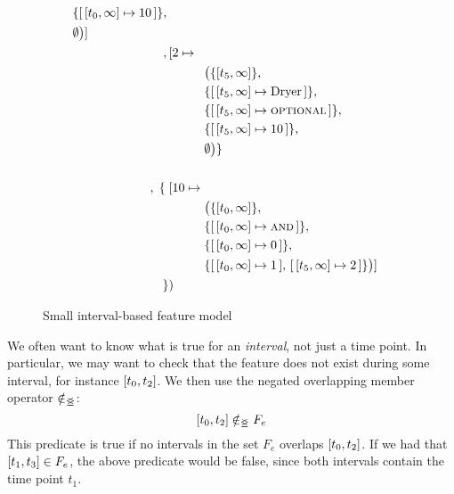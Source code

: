 \begin{figure}[htpb]
\begin{align*}
\begin{aligned}
             & \{\intervalmapping{t_0}{\forever}{10}\} ,\, \\ 
             & \emptyset\big)] \\
                \end{aligned} \\
         ,\, & [ 2 \mapsto \\
             & \hspace{1cm} \begin{aligned} & \big(\{\interval{t_5}{\forever}\} ,\, \\
             & \{\intervalmapping{t_5}{\forever}{\text{Dryer}}\} ,\, \\
             & \{\intervalmapping{t_5}{\forever}{\optional{}}\} ,\, \\
             &  \{\intervalmapping{t_5}{\forever}{10}\} ,\, \\ 
             & \emptyset\big) \}\\
               \end{aligned} \\
             \\
         ,\; \{ \; & [ 10 \mapsto \\
                   & \hspace{1cm} \begin{aligned} & \big(\{\interval{t_0}{\forever}\} ,\, \\
                         & \{\intervalmapping{t_0}{\forever}{\andtype{}}\} ,\, \\
                         & \{\intervalmapping{t_0}{\forever}{0}\} ,\, \\
                         & \{\intervalmapping{t_0}{\forever}{1},\, \intervalmapping{t_5}{\forever}{2}\} \big) ]\\
                     \end{aligned}\\
    \}&)\\
  \end{align*}
  \caption{Small interval-based feature model}
  \label{ex:washing-machine}
\end{figure}



We often want to know what is true for an \emph{interval}, not just a time point. In particular, we may want to check that the feature does not exist during some interval, for instance $\interval{t_0}{t_2}$. We then use the negated overlapping member operator $\notin_{\leq\!\!\!\!\geq{}}$:
\[
  \interval{t_0}{t_2} \notinnr F_e
\]
This predicate is true if no intervals in the set $F_e$ overlaps $\interval{t_0}{t_2}$. If we had that $\interval{t_1}{t_3} \in F_e$, the above predicate would be false, since both intervals contain the time point $t_1$.

